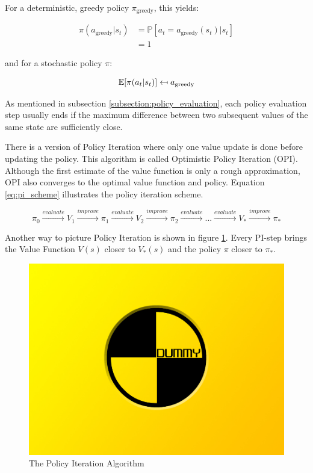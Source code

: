 For a deterministic, greedy policy $\pi_{\text{greedy}}$, this yields:

\begin{align}
\pi(a_{\text{greedy}}|s_t)&=\mathbb{P}[a_t=a_{\text{greedy}}(s_t)|s_t] \\ &=1
\end{align}

and for a stochastic policy $\pi$:

\begin{equation}
\mathbb{E}[\pi(a_t | s_t)] \mathrel{\reflectbox{\ensuremath{\mapsto}}} a_{\text{greedy}}
\end{equation}

As mentioned in subsection \ref{subsection:policy_evaluation}, each policy evaluation step usually ends if the maximum difference between two subsequent values of the same state are sufficiently close.

There is a version of Policy Iteration where only one value update is done before updating the policy. This algorithm is called Optimistic Policy Iteration (OPI). Although the first estimate of the value function is only a rough approximation, OPI also converges to the optimal value function and policy. Equation \ref{eq:pi_scheme} illustrates the policy iteration scheme.

\begin{equation*}
\pi_0 \overset{evaluate}{\longrightarrow} V_1 \overset{improve}{\longrightarrow} \pi_1 \overset{evaluate}{\longrightarrow} V_2 \overset{improve}{\longrightarrow} \pi_2 \overset{evaluate}{\longrightarrow} ... \overset{evaluate}{\longrightarrow} V_* \overset{improve}{\longrightarrow} \pi_*
\label{eq:pi_scheme}
\end{equation*}

Another way to picture Policy Iteration is shown in figure \ref{fig:PI_triangle}. Every PI-step brings the Value Function $V(s)$ closer to $V_*(s)$ and the policy $\pi$ closer to $\pi_*$.

\begin{figure}[h]
	\includegraphics[width=\textwidth]{src/pics/dummy.jpg}
	\caption{The Policy Iteration Algorithm}
	\label{fig:PI_triangle} 
\end{figure}

